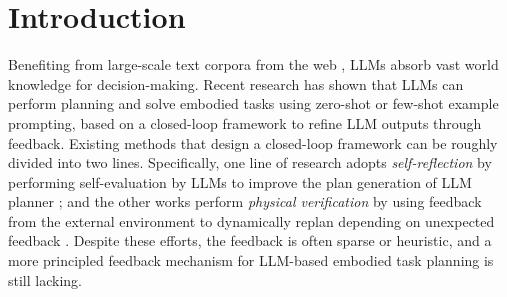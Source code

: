\documentclass[11pt]{article}
\theoremstyle{plain}
\theoremstyle{remark}
\begin{document}
\section{Introduction}
Benefiting from large-scale text corpora from the web \citep{devlin2019bert, radford2019language, brown2020language, raffel2023exploring}, LLMs absorb vast world knowledge for decision-making.
Recent research \citep{Firoozi2023FoundationMI, yao2023react, song2023llmplanner} has shown that LLMs can perform planning and solve embodied tasks using zero-shot or few-shot example prompting, based on a closed-loop framework to refine LLM outputs through feedback.
Existing methods that design a closed-loop framework can be roughly divided into two lines.
Specifically, one line of research adopts \emph{self-reflection} by performing self-evaluation by LLMs to improve the plan generation of LLM planner \citep{shinn2023reflexion, yao2023react,hao2023reasoning,liu2023RAFA}; and the other works perform \emph{physical verification} by using feedback from the external environment to dynamically replan depending on unexpected feedback \citep{huang2022Monologue,song2023llmplanner}. Despite these efforts, the feedback is often sparse or heuristic, and a more principled feedback mechanism for LLM-based embodied task planning is still lacking.
\end{document}
